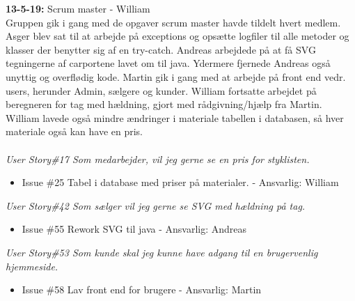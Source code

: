 \documentclass[11pt]{report}
\begin{document}
\noindent\textbf{13-5-19:} Scrum master - William\\
Gruppen gik i gang med de opgaver scrum master havde tildelt hvert medlem. 
Asger blev sat til at arbejde på exceptions og opsætte logfiler til
alle metoder og klasser der benytter sig af en try-catch. Andreas
arbejdede på at få SVG tegningerne af carportene lavet om til
java. Ydermere fjernede Andreas også unyttig og overflødig kode. Martin gik i gang med at arbejde på front end vedr. users, herunder Admin, sælgere og kunder.
William fortsatte arbejdet på beregneren for tag med hældning, gjort
med rådgivning/hjælp fra Martin. William lavede også mindre ændringer
i materiale tabellen i databasen, så hver materiale også kan have en
pris. \\\\
\textit{User Story\#17 Som medarbejder, vil jeg gerne se en pris for styklisten.}
\begin{itemize}
\renewcommand\labelitemi{--}
\item Issue \#25 Tabel i database med priser på materialer. - Ansvarlig: William
\end{itemize}
\textit{User Story\#42 Som sælger vil jeg gerne se SVG med hældning på tag.}
\begin{itemize}
\renewcommand\labelitemi{--}
\item Issue \#55 Rework SVG til java - Ansvarlig: Andreas
\end{itemize}
\textit{User Story\#53 Som kunde skal jeg kunne have adgang til en brugervenlig hjemmeside.}
\begin{itemize}
\renewcommand\labelitemi{--}
\item Issue \#58 Lav front end for brugere - Ansvarlig: Martin
\end{itemize}
\end{document}
